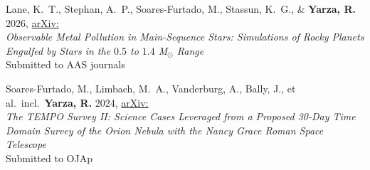 \item Lane, K.~T., Stephan, A.~P., Soares-Furtado, M., Stassun, K.~G., \& \textbf{Yarza, R.} 2026, \href{https://ui.adsabs.harvard.edu/abs/2026arXiv260100949L}{arXiv:}\\\textit{Observable Metal Pollution in Main-Sequence Stars: Simulations of Rocky Planets Engulfed by Stars in the $0.5$ to $1.4$ M$_\odot$ Range}\\Submitted to AAS journals

\item Soares-Furtado, M., Limbach, M.~A., Vanderburg, A., Bally, J., et al.\ incl.\ \textbf{Yarza, R.} 2024, \href{https://ui.adsabs.harvard.edu/abs/2024arXiv240601492S}{arXiv:}\\\textit{The TEMPO Survey II\@: Science Cases Leveraged from a Proposed 30-Day Time Domain Survey of the Orion Nebula with the Nancy Grace Roman Space Telescope}\\Submitted to OJAp
